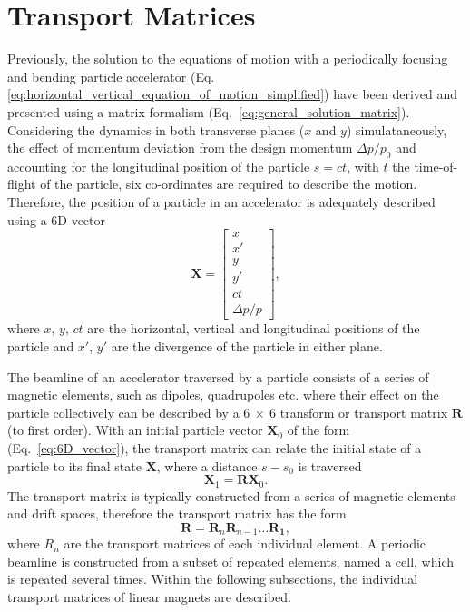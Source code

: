 \documentclass[../main.tex]{subfiles}
\begin{document}
\section{Transport Matrices} 

Previously, the solution to the equations of motion with a periodically focusing and bending particle accelerator (Eq.~ \ref{eq:horizontal_vertical_equation_of_motion_simplified}) have been derived and presented using a matrix formalism (Eq.~\ref{eq:general_solution_matrix}). Considering the dynamics in both transverse planes ($x$ and $y$) simulataneously, the effect of momentum deviation from the design momentum $\Delta p/p_{0}$ and accounting for the longitudinal position of the particle $s=ct$, with $t$ the time-of-flight of the particle, six co-ordinates are required to describe the motion. Therefore, the position of a particle in an accelerator is adequately described using a 6D vector 
\begin{equation}
\boldsymbol{X} = 
\begin{bmatrix}
x \\
x' \\
y \\
y' \\
ct \\
\Delta p/p
\end{bmatrix},
\label{eq:6D_vector}
\end{equation}
where $x$, $y$, $ct$ are the horizontal, vertical and longitudinal positions of the particle and $x'$, $y'$ are the divergence of the particle in either plane.

The beamline of an accelerator traversed by a particle consists of a series of magnetic elements, such as dipoles, quadrupoles etc. where their effect on the particle collectively can be described by a $6~\times~6$ transform or transport matrix $\boldsymbol{R}$ (to first order). With an initial particle vector $\boldsymbol{X}_{0}$ of the form (Eq.~\ref{eq:6D_vector}), the transport matrix can relate the initial state of a particle to its final state $\boldsymbol{X}$, where a distance $s-s_{0}$ is traversed
\begin{equation}
\boldsymbol{X}_{1} = \boldsymbol{R}\boldsymbol{X}_{0}.
\label{eq:overall_transport_matrix}
\end{equation}
The transport matrix is typically constructed from a series of magnetic elements and drift spaces, therefore the transport matrix has the form
\begin{equation}
\boldsymbol{R} = \boldsymbol{R}_{n}\boldsymbol{R}_{n-1}\ldots\boldsymbol{R_{1}},
\label{eq:subseries_transport_matrix}    
\end{equation}
where $R_{n}$ are the transport matrices of each individual element. A periodic beamline is constructed from a subset of repeated  elements, named a cell, which is repeated several times. Within the following subsections, the individual transport matrices of linear magnets are described. 
\end{document}
